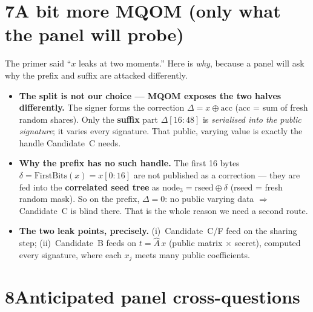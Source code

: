 \documentclass[11pt]{article}
\newcommand{\xor}{\oplus}
\begin{document}
\section*{7\quad A bit more MQOM (only what the panel will probe)}
The primer said ``$x$ leaks at two moments.'' Here is \emph{why}, because a panel will ask
why the prefix and suffix are attacked differently.

\begin{itemize}
\item \textbf{The split is not our choice --- MQOM exposes the two halves differently.}
The signer forms the correction $\Delta = x \xor \mathrm{acc}$ (acc = sum of fresh random
shares). Only the \textbf{suffix} part $\Delta[16{:}48]$ is \emph{serialised into the public
signature}; it varies every signature. That public, varying value is exactly the handle
Candidate~C needs.
\item \textbf{Why the prefix has no such handle.} The first 16 bytes
$\delta=\mathrm{FirstBits}(x)=x[0{:}16]$ are not published as a correction --- they are fed
into the \textbf{correlated seed tree} as $\text{node}_3=\text{rseed}\xor\delta$ (rseed =
fresh random mask). So on the prefix, $\Delta=0$: no public varying data $\Rightarrow$
Candidate~C is blind there. That is the whole reason we need a second route.
\item \textbf{The two leak points, precisely.}
(i)~Candidate~C/F feed on the sharing step; (ii)~Candidate~B feeds on
$t = \hat A\,x$ (public matrix $\times$ secret), computed every signature, where each $x_j$
meets many public coefficients.
\end{itemize}

\section*{8\quad Anticipated panel cross-questions}
\end{document}
